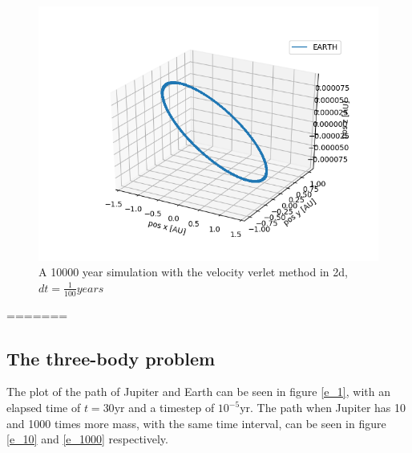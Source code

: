 \documentclass[a4paper]{article}
\begin{document}
\begin{figure}[h!]
	\centering 
	\includegraphics[scale=0.7]{vv1e4_3d.png}
	\caption{A 10000 year simulation with the velocity verlet method in 2d, $dt = \frac{1}{100}years$}
	\label{computation time plot}
\end{figure}
=======

\subsection{The three-body problem}
The plot of the path of Jupiter and Earth can be seen in figure \ref{e_1}, with an elapsed time of $t=30\text{yr}$ and a timestep of $10^{-5} \text{yr}$. The path when Jupiter has 10 and 1000 times more mass, with the same time interval, can be seen in figure \ref{e_10} and \ref{e_1000} respectively. 
\end{document}
